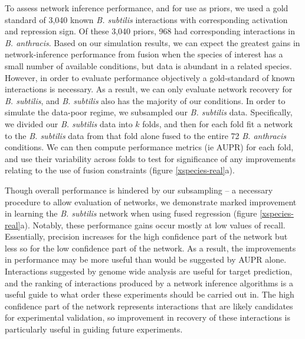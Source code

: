 \documentclass[11pt]{article}
\begin{document}
To assess network inference performance, and for use as priors, we used a gold standard of 3,040 known \textit{B. subtilis} interactions with corresponding activation and repression sign. Of these 3,040 priors, 968 had corresponding interactions in \textit{B. anthracis}. Based on our simulation results, we can expect the greatest gains in network-inference performance from fusion when the species of interest has a small number of available conditions, but data is abundant in a related species. However, in order to evaluate performance objectively a gold-standard of known interactions is necessary. As a result, we can only evaluate network recovery for \textit{B. subtilis}, and \textit{B. subtilis} also has the majority of our conditions. In order to simulate the data-poor regime, we subsampled our \textit{B. subtilis} data. Specifically, we divided our \textit{B. subtilis} data into $k$ folds, and then for each fold fit a network to the \textit{B. subtilis} data from that fold alone fused to the entire 72 \textit{B. anthracis} conditions. We can then compute performance metrics (ie AUPR) for each fold, and use their variability across folds to test for significance of any improvements relating to the use of fusion constraints (figure \ref{xspecies-real}a). 

Though overall performance is hindered by our subsampling -- a necessary procedure to allow evaluation of networks, we demonstrate marked improvement in learning the \textit{B. subtilis} network when using fused regression (figure \ref{xspecies-real}a). Notably, these performance gains occur mostly at low values of recall. Essentially, precision increases for the high confidence part of the network but less so for the low confidence part of the network. As a result, the improvements in performance may be more useful than would be suggested by AUPR alone. Interactions suggested by genome wide analysis are useful for target prediction, and the ranking of interactions produced by a network inference algorithms is a useful guide to what order these experiments should be carried out in. The high confidence part of the network represents interactions that are likely candidates for experimental validation, so improvement in recovery of these interactions is particularly useful in guiding future experiments. 
\end{document}
